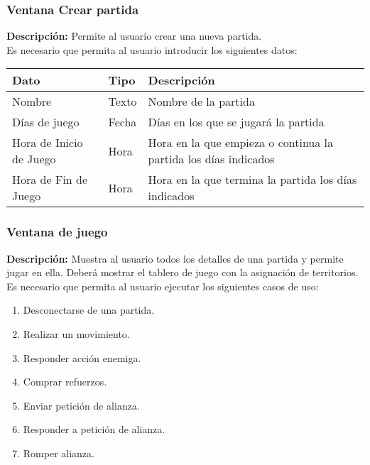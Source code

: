 \subsubsection{Ventana Crear partida}
{\footnotesize

 \textbf{Descripción:}  Permite al usuario crear una nueva partida.\\
Es necesario que
permita al usuario introducir los siguientes datos: \\

\begin{tabularx}{0.9\textwidth}{llX}
\hline
\textbf{Dato} & \textbf{Tipo} & \textbf{Descripción} \\
\hline
Nombre & Texto & Nombre de la partida \\
Días de juego & Fecha & Días en los que se jugará la partida\\
Hora de Inicio de Juego & Hora & Hora en la que empieza o continua la partida
los días indicados\\
Hora de Fin de Juego & Hora & Hora en la que termina la partida los días
indicados\\
\hline
\end{tabularx}
}

\subsubsection{Ventana de juego}
{\footnotesize



 \textbf{Descripción:}  Muestra al usuario todos los detalles de una partida y
permite
jugar en ella. Deberá mostrar el tablero de juego con la asignación de
territorios.\\

Es necesario que
permita al usuario ejecutar los siguientes casos de uso: \\
\begin{enumerate}
\item Desconectarse de una partida.
\item Realizar un movimiento.
\item Responder acción enemiga.
\item Comprar refuerzos.
\item Enviar petición de alianza.
\item Responder a petición de alianza.
\item Romper alianza.

\end{enumerate}


}
